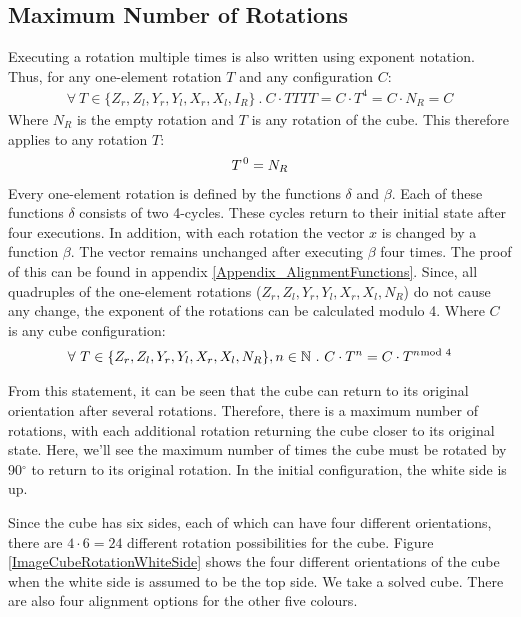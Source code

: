 \subsection{Maximum Number of Rotations}
\label{Section_MaxNumberRotations}

Executing a rotation multiple times is also written using exponent notation.
Thus, for any one-element rotation $T$ and any configuration $C$:
\begin{align*}
\forall \ T \in \{{Z_r}, {Z_l}, {Y_r}, {Y_l}, {X_r}, {X_l} , I_R \} \ . \ C \cdot TTTT= C \cdot T^4=C \cdot N_R = C
\end{align*}
Where $N_R$ is the empty rotation and $T$ is any rotation of the cube. This therefore applies to any rotation $T$:
\begin{align*}
T^{\hspace*{0.1em}0}=N_R
\end{align*}
Every one-element rotation is defined by the functions $\delta$ and $\beta$. Each of these functions $\delta$ consists of two 4-cycles. These cycles return to their initial state after four executions.  In addition, with each rotation the vector $x$ is changed by a function $\beta$. The vector remains unchanged after executing $\beta$ four times. 
The proof of this can be found in appendix \ref{Appendix_AlignmentFunctions}.
Since, all quadruples of the one-element rotations (${Z_r}, {Z_l}, {Y_r}, {Y_l}, {X_r}, {X_l} , N_R$) do not cause any change, the exponent of the rotations can be calculated modulo 4. Where $C$ is any cube configuration:
\begin{align*}
\forall \ T \in \{{Z_r}, {Z_l}, {Y_r}, {Y_l}, {X_r}, {X_l}, N_R \}, n \in \mathbb{N} \ . \ C \cdot T^n=C \cdot T^{n \hspace*{-0.5em} \mod 4}
\end{align*}

From this statement, it can be seen that the cube can return to its original orientation after several rotations. Therefore, there is a maximum number of rotations, with each additional rotation returning the cube closer to its original state.
Here, we'll see the maximum number of times the cube must be rotated by 90$^\circ$ to return to its original rotation. In the initial configuration, the white side is up.

Since the cube has six sides, each of which can have four different orientations, there are $4 \cdot 6 = 24$ different rotation possibilities for the cube. Figure \ref{ImageCubeRotationWhiteSide} shows the four different orientations of the cube when the white side is assumed to be the top side. We take a solved cube. There are also four alignment options for the other five colours. 

